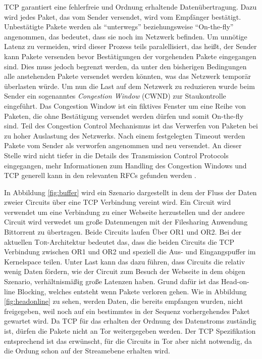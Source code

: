 \documentclass[fleqn,envcountsame,runningheads,10pt,a4paper]{llncs}
\begin{document}
TCP garantiert eine fehlerfreie und Ordnung erhaltende Datenübertragung.
Dazu wird jedes Paket, das vom Sender versendet, wird vom Empfänger bestätigt.
Unbestätigte Pakete werden als ``unterwegs'' beziehungsweise ``On-the-fly'' angenommen, das bedeutet, dass sie noch im Netzwerk befinden.
Um unnötige Latenz zu vermeiden, wird dieser Prozess teils paralellisiert, das heißt, der Sender kann Pakete versenden bevor Bestätigungen der vorgehenden Pakete eingegangen sind.
Dies muss jedoch begrenzt werden, da unter den bisherigen Bedingungen alle anstehenden Pakete versendet werden könnten, was das Netzwerk temporär überlasten würde.
Um nun die Last auf dem Netzwerk zu reduzieren wurde beim Sender ein sogenanntes \textit{Congestion Window} (CWND) zur Staukontrolle eingeführt.
Das Congestion Window ist ein fiktives Fenster um eine Reihe von Paketen, die ohne Bestätigung versendet werden dürfen und somit On-the-fly sind.
Teil des Congestion Control Mechanismus ist das Verwerfen von Paketen bei zu hoher Auslastung des Netzwerks.
Nach einem festgelegten Timeout werden Pakete vom Sender als verworfen angenommen und neu versendet.
An dieser Stelle wird nicht tiefer in die Details des Transmission Control Protocols eingegangen, mehr Informationen zum Handling des Congestion Windows und TCP generell kann in den relevanten RFCs gefunden werden \cite{rfc:tcp, rfc:tcpcc}.

In Abbildung \ref{fig:buffer} wird ein Szenario dargestellt in dem der Fluss der Daten zweier Circuits über eine TCP Verbindung vereint wird.
Ein Circuit wird verwendet um eine Verbindung zu einer Webseite herzustellen und der andere Circuit wird verwedet um große Datenmengen mit der Filesharing Anwendung Bittorrent zu übertragen.
Beide Circuits laufen Über OR1 und OR2. 
Bei der aktuellen \textsc{Tor}-Architektur bedeutet das, dass die beiden Circuits die TCP Verbindung zwischen OR1 und OR2 und speziell die Aus- und Eingangspuffer im Kernelspace teilen.
Unter Last kann das dazu führen, dass Circuits die relativ wenig Daten fördern, wie der Circuit zum Besuch der Webseite in dem obigen Szenario, verhältnismäßig große Latenzen haben.
Grund dafür ist das Head-on-line Blocking, welches entsteht wenn Pakete verloren gehen.
Wie in Abbildung \ref{fig:headonline} zu sehen, werden Daten, die bereits empfangen wurden, nicht freigegeben, weil noch auf ein bestimmtes in der Sequenz vorhergehendes Paket gewartet wird.
Da TCP für das erhalten der Ordnung des Datenstroms zuständig ist, dürfen die Pakete nicht an Tor weitergegeben werden.
Der TCP Spezifikation entsprechend ist das erwünscht, für die Circuits in Tor aber nicht notwendig, da die Ordung schon auf der Streamebene erhalten wird.
\end{document}
